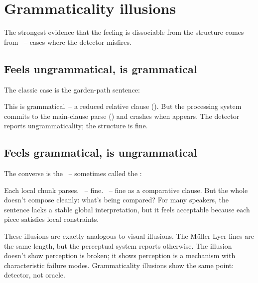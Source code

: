 \section{Grammaticality illusions}
\label{sec:14:illusions}

The strongest evidence that the feeling is dissociable from the structure comes from ~-- cases where the detector misfires.

\subsection{Feels ungrammatical, is grammatical}
\label{sec:14:feels-ungrammatical}

The classic case is the garden-path sentence:

\z

This is grammatical~-- a reduced relative clause (). But the processing system commits to the main-clause parse () and crashes when  appears. The detector reports ungrammaticality; the structure is fine.

\subsection{Feels grammatical, is ungrammatical}
\label{sec:14:feels-grammatical}

The converse is the ~-- sometimes called the :

\z

Each local chunk parses. ~-- fine. ~-- fine as a comparative clause. But the whole doesn't compose cleanly: what's being compared? For many speakers, the sentence lacks a stable global interpretation, but it feels acceptable because each piece satisfies local constraints.

These illusions are exactly analogous to visual illusions. The Müller-Lyer lines are the same length, but the perceptual system reports otherwise. The illusion doesn't show perception is broken; it shows perception is a mechanism with characteristic failure modes. Grammaticality illusions show the same point: detector, not oracle.

